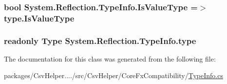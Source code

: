 \hypertarget{a00155_ae2255904b8743c47a185d62909404aed}{
\subsubsection[{Is\-Value\-Type}]{\setlength{\rightskip}{0pt plus 5cm}bool System.\-Reflection.\-Type\-Info.\-Is\-Value\-Type =$>$ type.\-Is\-Value\-Type}}\label{a00155_ae2255904b8743c47a185d62909404aed}
\hypertarget{a00155_a71c4f4b000d08808c8965222d4ba1b8d}{
\subsubsection[{type}]{\setlength{\rightskip}{0pt plus 5cm}readonly Type System.\-Reflection.\-Type\-Info.\-type\hspace{0.3cm}{\ttfamily [private]}}}\label{a00155_a71c4f4b000d08808c8965222d4ba1b8d}


The documentation for this class was generated from the following file\-:\begin{DoxyCompactItemize}
\item 
packages/\-Csv\-Helper..../src/\-Csv\-Helper/\-Core\-Fx\-Compatibility/\hyperlink{a00192}{Type\-Info.\-cs}\end{DoxyCompactItemize}

